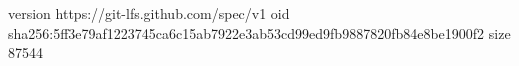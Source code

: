 version https://git-lfs.github.com/spec/v1
oid sha256:5ff3e79af1223745ca6c15ab7922e3ab53cd99ed9fb9887820fb84e8be1900f2
size 87544
